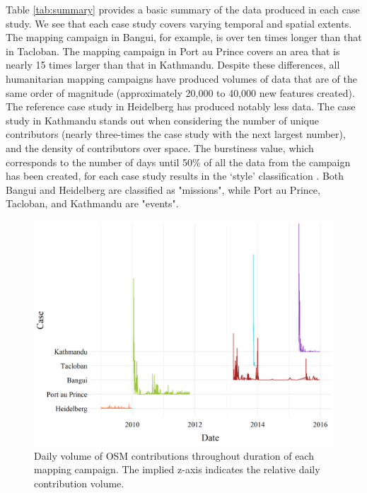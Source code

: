 Table \ref{tab:summary} provides a basic summary of the data produced in each case study. We see that each case study covers varying temporal and spatial extents. The mapping campaign in Bangui, for example, is over ten times longer than that in Tacloban. The mapping campaign in Port au Prince covers an area that is nearly 15 times larger than that in Kathmandu. Despite these differences, all humanitarian mapping campaigns have produced volumes of data that are of the same order of magnitude (approximately 20,000 to 40,000 new features created). The reference case study in Heidelberg has produced notably less data. The case study in Kathmandu stands out when considering the number of unique contributors (nearly three-times the case study with the next largest number), and the density of contributors over space. The burstiness value, which corresponds to the number of days until 50\% of all the data from the campaign has been created, for each case study results in the ‘style’ classification \parencite{dittus_mass_2017}. Both Bangui and Heidelberg are classified as "missions", while Port au Prince, Tacloban, and Kathmandu are "events". 

\begin{figure} %
    \centering %
    \includegraphics[width = \textwidth]{Images/overtime.png} %
    \caption[Daily volume of OSM contributions throughout duration of each mapping campaign.]{Daily volume of OSM contributions throughout duration of each mapping campaign. The implied z-axis indicates the relative daily contribution volume.} %
    \label{fig:time} %
\end{figure}


